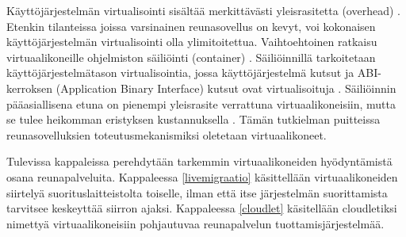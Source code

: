 Käyttöjärjestelmän virtualisointi sisältää merkittävästi yleisrasitetta (overhead) \cite{xavier2013performance}. Etenkin tilanteissa joissa varsinainen reunasovellus on kevyt, voi kokonaisen käyttöjärjestelmän virtualisointi olla ylimitoitettua. Vaihtoehtoinen ratkaisu virtuaalikoneille ohjelmiston säiliöinti (container) \cite{soltesz2007container}.
Säiliöinnillä tarkoitetaan käyttöjärjestelmätason virtualisointia, jossa käyttöjärjestelmä kutsut ja ABI-kerroksen (Application Binary Interface) kutsut ovat virtualisoituja \cite{soltesz2007container}.
Säiliöinnin pääasiallisena etuna on pienempi yleisrasite verrattuna virtuaalikoneisiin, mutta se tulee heikomman eristyksen kustannuksella \cite{soltesz2007container}.
Tämän tutkielman puitteissa reunasovelluksien toteutusmekanismiksi oletetaan virtuaalikoneet.

Tulevissa kappaleissa perehdytään tarkemmin virtuaalikoneiden hyödyntämistä osana reunapalveluita.
Kappaleessa \ref{livemigraatio} käsittellään virtuaalikoneiden siirtelyä suorituslaitteistolta toiselle, ilman että itse järjestelmän suorittamista tarvitsee keskeyttää siirron ajaksi. 
Kappaleessa \ref{cloudlet} käsitellään cloudletiksi nimettyä virtuaalikoneisiin pohjautuvaa reunapalvelun tuottamisjärjestelmää.




